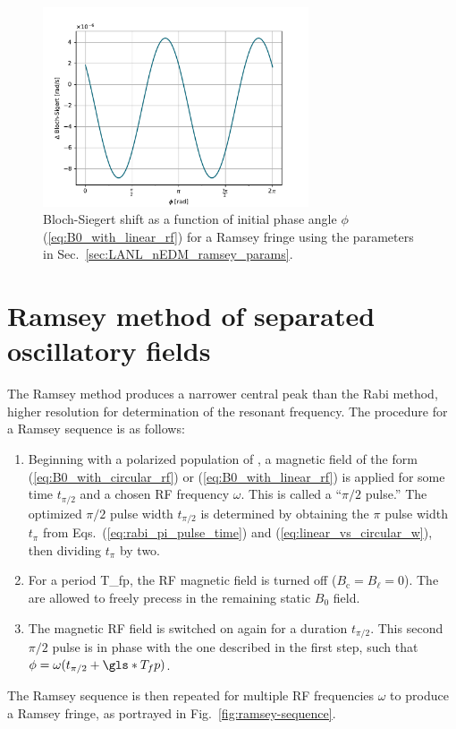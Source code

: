 \begin{figure}
    \centering
    \includegraphics[width=0.7\textwidth]{figures/bloch-siegert-lanl-params.pdf}
    \caption
    {Bloch-Siegert shift as a function of initial phase angle $\phi$ (\ref{eq:B0_with_linear_rf}) for a Ramsey fringe using the parameters in Sec.~\ref{sec:LANL_nEDM_ramsey_params}.}
    \label{fig:bloch-siegert-phase}
\end{figure}



\section{Ramsey method of separated oscillatory fields\label{sec:ramsey-method}}


The Ramsey method produces a narrower central peak than the Rabi method, higher resolution for determination of the resonant frequency. The procedure for a Ramsey sequence is as follows:
%
\begin{enumerate}
    \item Beginning with a polarized population of \ucn, a magnetic field of the form (\ref{eq:B0_with_circular_rf}) or (\ref{eq:B0_with_linear_rf}) is applied for some time $t_{\pi/2}$ and a chosen RF frequency $\omega$. This is called a ``$\pi/2$ pulse.'' The optimized $\pi/2$ pulse width $t_{\pi/2}$ is determined by obtaining the $\pi$ pulse width $t_\pi$ from Eqs.~(\ref{eq:rabi_pi_pulse_time}) and (\ref{eq:linear_vs_circular_w}), then dividing $t_\pi$ by two.
    \item For a period \gls{T_fp}, the RF magnetic field is turned off ($B_\text{c}=B_\ell=0$). The \ucn are allowed to freely precess in the remaining static $B_0$ field.
    \item The magnetic RF field is switched on again for a duration $t_{\pi/2}$. This second $\pi/2$ pulse is in phase with the one described in the first step, such that $\phi = \omega ( t_{\pi/2} + \gls*{T_fp})$.
\end{enumerate}
%
The Ramsey sequence is then repeated for multiple RF frequencies $\omega$ to produce a Ramsey fringe, as portrayed in Fig.~\ref{fig:ramsey-sequence}. 

